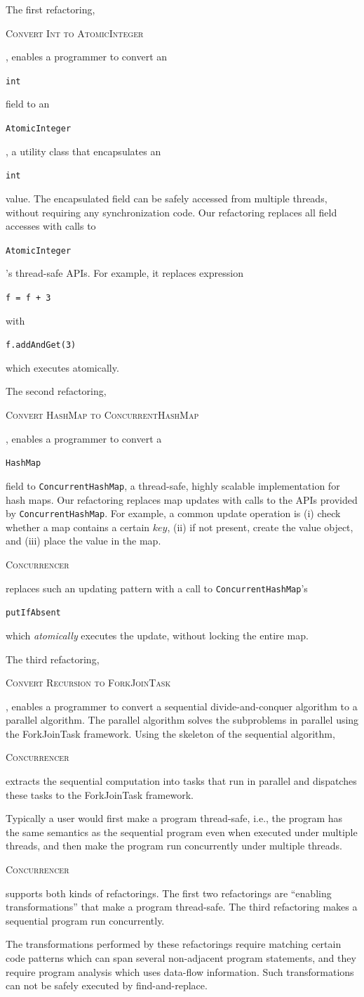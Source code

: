 \documentclass[10pt,twocolumn]{article}
\newcommand{\tool}{\begin{scriptsize}\textsc{Concurrencer}\end{scriptsize}\xspace}
\newcommand{\code}[1]{\begin{smaller}\texttt{#1}\end{smaller}}
\newcommand{\codex}[1]{{\smaller\texttt{#1}}\xspace}
\newcommand{\ConvertToAtomicInteger}{{\begin{smaller}\begin{smaller}\textsc{Convert Int to AtomicInteger}\end{smaller}\end{smaller}}\xspace}
\newcommand{\ConvertToConcurrentHashMap}{{\begin{smaller}\begin{smaller}\textsc{Convert HashMap to ConcurrentHashMap}\end{smaller}\end{smaller}}\xspace}
\newcommand{\ConvertToForkJoinTask}{{\begin{smaller}\begin{smaller}\textsc{Convert Recursion to ForkJoinTask}\end{smaller}\end{smaller}}\xspace}
\newcommand{\ConcurrentHashMap}{\codex{Con\-cur\-rent\-Hash\-Map}}
\begin{document}
The first refactoring, \ConvertToAtomicInteger, enables a programmer to
convert an \code{int} field to an \code{AtomicInteger}, a utility
class that encapsulates an \code{int} value. The encapsulated field can be
safely accessed from multiple threads, without requiring any synchronization
code. Our refactoring replaces all field accesses with calls to
\code{AtomicInteger}'s thread-safe APIs. For example, it replaces expression
\code{f = f + 3} with \code{f.addAndGet(3)} which executes atomically. 


The second refactoring, \ConvertToConcurrentHashMap, enables a programmer
to convert a \code{HashMap} field to \ConcurrentHashMap, a thread-safe,
highly scalable implementation for hash maps. Our refactoring replaces map
updates with calls to the APIs provided by \ConcurrentHashMap. For
example, a common update operation is (i) check whether a map contains a
certain $key$, (ii) if not present, create the value object, and (iii) place
the value in the map. \tool replaces such an updating pattern with a call 
to \ConcurrentHashMap's \code{putIfAbsent} which
\emph{atomically} executes the update, without locking the entire map. 

The third refactoring, \ConvertToForkJoinTask, enables a
programmer to convert a sequential divide-and-conquer algorithm to a parallel
algorithm. The parallel algorithm solves the subproblems in parallel
using the ForkJoinTask framework. Using the skeleton of the sequential
algorithm, \tool extracts the sequential computation into tasks that run in
parallel and dispatches these tasks to the ForkJoinTask framework.

Typically a user would first make a program thread-safe, i.e., the program has 
the same semantics as the sequential program even when executed under multiple 
threads, and then make the program run concurrently under multiple threads. 
\tool supports both kinds of refactorings. The first two refactorings 
are ``enabling transformations'' that make a program thread-safe. The 
third refactoring makes a sequential program run concurrently.

The transformations performed by these refactorings require matching certain
code patterns which can span several non-adjacent program statements, and they
require program analysis which uses data-flow information. Such transformations
can not be safely executed by find-and-replace.

 
\end{document}
